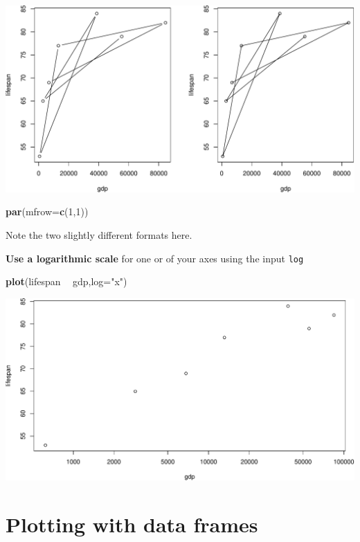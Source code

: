 \documentclass[
]{book}
\newenvironment{Shaded}{\begin{snugshade}}{\end{snugshade}}
\newcommand{\DataTypeTok}[1]{\textcolor[rgb]{0.13,0.29,0.53}{#1}}
\newcommand{\DecValTok}[1]{\textcolor[rgb]{0.00,0.00,0.81}{#1}}
\newcommand{\KeywordTok}[1]{\textcolor[rgb]{0.13,0.29,0.53}{\textbf{#1}}}
\newcommand{\NormalTok}[1]{#1}
\newcommand{\OperatorTok}[1]{\textcolor[rgb]{0.81,0.36,0.00}{\textbf{#1}}}
\newcommand{\StringTok}[1]{\textcolor[rgb]{0.31,0.60,0.02}{#1}}
\begin{document}
\includegraphics{figures/unnamed-chunk-237-1.pdf}

\begin{Shaded}
\begin{Highlighting}[]
\KeywordTok{par}\NormalTok{(}\DataTypeTok{mfrow=}\KeywordTok{c}\NormalTok{(}\DecValTok{1}\NormalTok{,}\DecValTok{1}\NormalTok{))}
\end{Highlighting}
\end{Shaded}

Note the two slightly different formats here.

\textbf{Use a logarithmic scale} for one or of your axes using the input \texttt{log}

\begin{Shaded}
\begin{Highlighting}[]
\KeywordTok{plot}\NormalTok{(lifespan }\OperatorTok{~}\StringTok{ }\NormalTok{gdp,}\DataTypeTok{log=}\StringTok{"x"}\NormalTok{)}
\end{Highlighting}
\end{Shaded}

\includegraphics{figures/unnamed-chunk-238-1.pdf}

\hypertarget{plotting-with-data-frames}{%
\section*{Plotting with data frames}\label{plotting-with-data-frames}}
\end{document}
